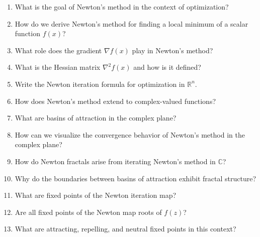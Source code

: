 \begin{enumerate}
  \item What is the goal of Newton's method in the context of optimization?
  \item How do we derive Newton's method for finding a local minimum of a scalar function $f(x)$?
  \item What role does the gradient $\nabla f(x)$ play in Newton's method?
  \item What is the Hessian matrix $\nabla^2 f(x)$ and how is it defined?
  \item Write the Newton iteration formula for optimization in $\mathbb{R}^n$.
  \item How does Newton's method extend to complex-valued functions?
  \item What are basins of attraction in the complex plane?
  \item How can we visualize the convergence behavior of Newton's method in the complex plane?
  \item How do Newton fractals arise from iterating Newton's method in $\mathbb{C}$?
  \item Why do the boundaries between basins of attraction exhibit fractal structure?
  \item What are fixed points of the Newton iteration map?
  \item Are all fixed points of the Newton map roots of $f(z)$?
  \item What are attracting, repelling, and neutral fixed points in this context?
\end{enumerate}

